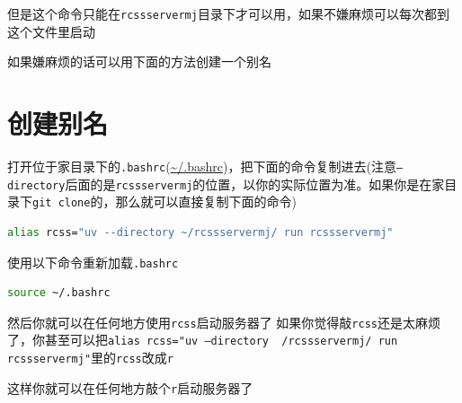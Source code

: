 \documentclass[11pt, UTF8, a4paper]{ctexart} %
\begin{document}
但是这个命令只能在\texttt{rcssservermj}目录下才可以用，如果不嫌麻烦可以每次都到这个文件里启动

如果嫌麻烦的话可以用下面的方法创建一个别名

\newpage

\section{创建别名}
打开位于家目录下的\texttt{.bashrc}(\url{~/.bashrc})，把下面的命令复制进去(注意\texttt{--directory}后面的是\texttt{rcssservermj}的位置，以你的实际位置为准。如果你是在家目录下\texttt{git clone}的，那么就可以直接复制下面的命令)
\begin{lstlisting}[language=bash]
alias rcss="uv --directory ~/rcssservermj/ run rcssservermj"
\end{lstlisting}

使用以下命令重新加载\texttt{.bashrc}
\begin{lstlisting}[language=bash]
source ~/.bashrc
\end{lstlisting}

然后你就可以在任何地方使用\texttt{rcss}启动服务器了
\bigbreak
如果你觉得敲\texttt{rcss}还是太麻烦了，你甚至可以把\texttt{alias rcss="uv --directory ~/rcssservermj/ run rcssservermj"}里的\texttt{rcss}改成\texttt{r}

这样你就可以在任何地方敲个\texttt{r}启动服务器了
\end{document}
